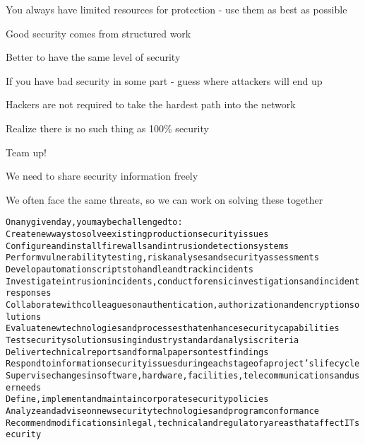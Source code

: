 \documentclass[Screen16to9,17pt]{foils}
\begin{document}
\begin{list1}
\item You always have limited resources for protection - use them as best as possible
\item Good security comes from structured work
\end{list1}




\begin{list1}
\item Better to have the same level of security
\item If you have bad security in some part - guess where attackers will end up
\item Hackers are not required to take the hardest path into the network
\item Realize there is no such thing as 100\% security
\end{list1}





\begin{list1}
\item Team up!
\item We need to share security information freely
\item We often face the same threats, so we can work on solving these together
\end{list1}


\begin{alltt}\footnotesize
On any given day, you may be challenged to:
        Create new ways to solve existing production security issues
        Configure and install firewalls and intrusion detection systems
        Perform vulnerability testing, risk analyses and security assessments
        Develop automation scripts to handle and track incidents
        Investigate intrusion incidents, conduct forensic investigations and incident responses
        Collaborate with colleagues on authentication, authorization and encryption solutions
        Evaluate new technologies and processes that enhance security capabilities
        Test security solutions using industry standard analysis criteria
        Deliver technical reports and formal papers on test findings
        Respond to information security issues during each stage of a project’s lifecycle
        Supervise changes in software, hardware, facilities, telecommunications and user needs
        Define, implement and maintain corporate security policies
        Analyze and advise on new security technologies and program conformance
        Recommend modifications in legal, technical and regulatory areas that affect IT security
\end{alltt}
\end{document}
